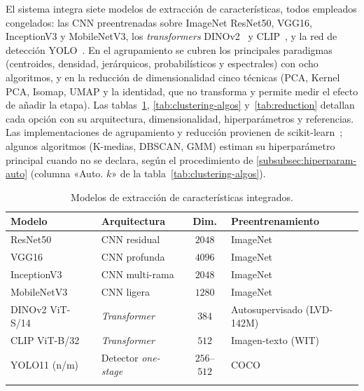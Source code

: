 El sistema integra siete modelos de extracción de características, todos
empleados congelados: las CNN preentrenadas sobre ImageNet ResNet50, VGG16,
InceptionV3 y MobileNetV3, los \textit{transformers}
DINOv2~\cite{oquab_dinov2_2024} y CLIP~\cite{radford_learning_2021}, y la red de
detección YOLO~\cite{ultralytics_ultralytics_2024}. En el agrupamiento se
cubren los principales paradigmas (centroides, densidad, jerárquicos,
probabilísticos y espectrales) con ocho algoritmos, y en la reducción de
dimensionalidad cinco técnicas (PCA, Kernel PCA, Isomap, UMAP y la identidad,
que no transforma y permite medir el efecto de añadir la etapa). Las
tablas~\ref{tab:embedding-models}, \ref{tab:clustering-algos}
y~\ref{tab:reduction} detallan cada opción con su arquitectura, dimensionalidad,
hiperparámetros y referencias. Las implementaciones de agrupamiento y reducción
provienen de scikit-learn~\cite{pedregosa_scikit-learn_2011}; algunos algoritmos
(K-medias, DBSCAN, GMM) estiman su hiperparámetro principal cuando no se
declara, según el procedimiento de \ref{subsubsec:hiperparam-auto} (columna
«Auto. $k$» de la tabla~\ref{tab:clustering-algos}).

\begin{longtable}{|p{3.2cm}|p{3.8cm}|c|p{4.2cm}|} \hline
  \textbf{Modelo} & \textbf{Arquitectura} & \textbf{Dim.} & \textbf{Preentrenamiento} \\ \hline
  ResNet50~\cite{he_deep_2015} & CNN residual & $2048$ & ImageNet \\ \hline
  VGG16~\cite{simonyan_very_2015} & CNN profunda & $4096$ & ImageNet \\ \hline
  InceptionV3~\cite{szegedy_rethinking_2015} & CNN multi-rama & $2048$ & ImageNet \\ \hline
  MobileNetV3~\cite{howard_searching_2019} & CNN ligera & $1280$ & ImageNet \\ \hline
  DINOv2 ViT-S/14~\cite{oquab_dinov2_2024} & \textit{Transformer}~\cite{dosovitskiy_image_2021} & $384$ & Autosupervisado (LVD-142M) \\ \hline
  CLIP ViT-B/32~\cite{radford_learning_2021} & \textit{Transformer} & $512$ & Imagen-texto (WIT) \\ \hline
  YOLO11 (n/m)~\cite{ultralytics_ultralytics_2024} & Detector \textit{one-stage} & $256$--$512$ & COCO \\ \hline
  \caption{Modelos de extracción de características integrados.}
  \label{tab:embedding-models}
\end{longtable}

